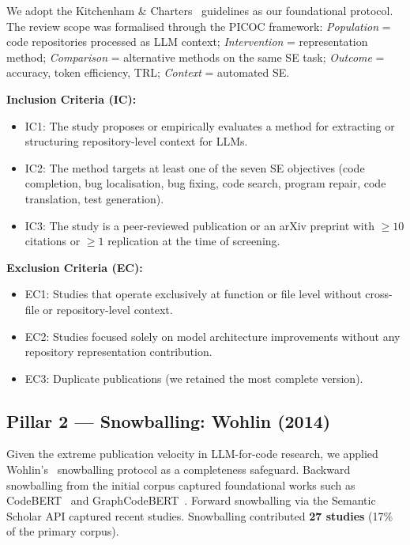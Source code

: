 \documentclass[acmsmall,screen,review]{acmart}
\begin{document}
We adopt the Kitchenham \& Charters~\cite{Kitchenham2007} guidelines as
our foundational protocol. The review scope was formalised through the
PICOC framework: \emph{Population} = code repositories processed as LLM
context; \emph{Intervention} = representation method; \emph{Comparison}
= alternative methods on the same SE task; \emph{Outcome} = accuracy,
token efficiency, TRL; \emph{Context} = automated SE.

\noindent\textbf{Inclusion Criteria (IC):}
\begin{itemize}
  \item IC1: The study proposes or empirically evaluates a method for
    extracting or structuring repository-level context for LLMs.
  \item IC2: The method targets at least one of the seven SE objectives
    (code completion, bug localisation, bug fixing, code search,
    program repair, code translation, test generation).
  \item IC3: The study is a peer-reviewed publication or an arXiv
    preprint with $\geq 10$ citations or $\geq 1$ replication at the
    time of screening.
\end{itemize}

\noindent\textbf{Exclusion Criteria (EC):}
\begin{itemize}
  \item EC1: Studies that operate exclusively at function or file level
    without cross-file or repository-level context.
  \item EC2: Studies focused solely on model architecture improvements
    without any repository representation contribution.
  \item EC3: Duplicate publications (we retained the most complete
    version).
\end{itemize}

\subsection{Pillar 2 — Snowballing: Wohlin (2014)}

Given the extreme publication velocity in LLM-for-code research, we
applied Wohlin's~\cite{Wohlin2014} snowballing protocol as a
completeness safeguard. Backward snowballing from the initial corpus
captured foundational works such as CodeBERT~\cite{Feng2020CodeBERT}
and GraphCodeBERT~\cite{Guo2021GraphCodeBERT}. Forward snowballing via
the Semantic Scholar API captured recent studies. Snowballing
contributed \textbf{27 studies} (17\% of the primary corpus).
\end{document}
